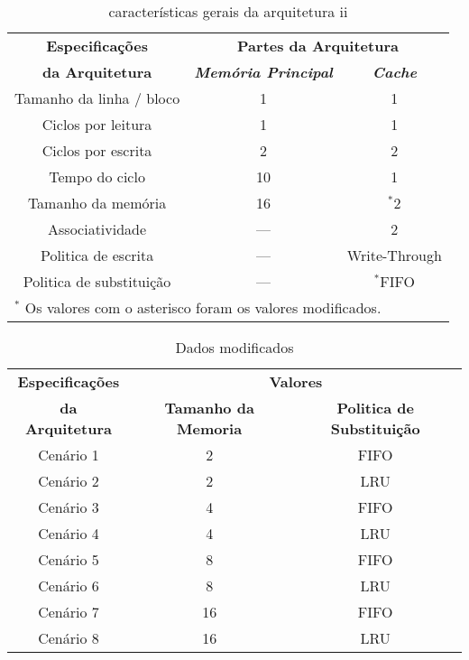     \begin{table}[H]
    \caption{características gerais da arquitetura ii}
    \centering
        \begin{tabular}{|c|c|c|}
            \hline
            \textbf{Especificações} & \multicolumn{2}{|c|}{\textbf{Partes da Arquitetura}} \\
            \cline{2-3} 
            \textbf{da Arquitetura} & \textbf{\textit{Memória Principal}}& \textbf{\textit{Cache}} \\
            \hline
            Tamanho da linha / bloco & 1 & 1  \\
            \hline
            Ciclos por leitura & 1 & 1  \\
            \hline
            Ciclos por escrita & 2 & 2  \\
            \hline
            Tempo do ciclo & 10 & 1  \\
            \hline
            Tamanho da memória & 16 & {$^{\mathrm{*}}$}2  \\
            \hline
            Associatividade & --- & 2  \\
            \hline
            Politica de escrita & --- & Write-Through  \\
            \hline
            Politica de substituição & --- & {$^{\mathrm{*}}$}FIFO  \\
            \hline
            \multicolumn{3}{l}{$^{\mathrm{*}}$ Os valores com o asterisco foram os valores modificados.}
        \end{tabular}
        \label{tab2}
    \end{table}

    \begin{table}[H]
    \caption{Dados modificados}
    \centering
        \begin{tabular}{|c|c|c|}
            \hline
            \textbf{Especificações} & \multicolumn{2}{|c|}{\textbf{Valores}} \\
            \cline{2-3} 
            \textbf{da Arquitetura} & \textbf{Tamanho da Memoria} & \textbf{Politica de Substituição} \\
            \hline
            Cenário 1 & 2 & FIFO \\
            \hline
            Cenário 2 & 2 & LRU \\
            \hline
            Cenário 3 & 4 & FIFO\\
            \hline
            Cenário 4 & 4 & LRU\\
            \hline
            Cenário 5 & 8 & FIFO\\
            \hline
            Cenário 6 & 8 & LRU\\
            \hline
            Cenário 7 & 16 & FIFO\\
            \hline
            Cenário 8 & 16 & LRU\\
            \hline
        \end{tabular}
        \label{tab3}
    \end{table}

